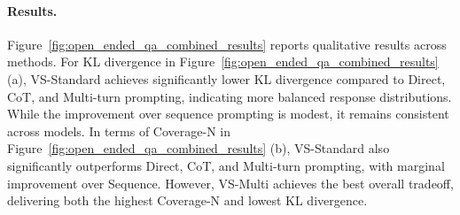 \begin{figure}
    \captionsetup{skip=2pt}
    \centering


    \label{tab:bias_coverage_test}
    \vspace{-2em}
\end{figure}

\paragraph{Results.} 
Figure~\ref{fig:open_ended_qa_combined_results} reports qualitative results across methods. 
For KL divergence in Figure~\ref{fig:open_ended_qa_combined_results} (a), VS-Standard achieves significantly lower KL divergence compared to Direct, CoT, and Multi-turn prompting, indicating more balanced response distributions. While the improvement over sequence prompting is modest, it remains consistent across models. 
In terms of Coverage-N in Figure~\ref{fig:open_ended_qa_combined_results} (b), VS-Standard also significantly outperforms Direct, CoT, and Multi-turn prompting, with marginal improvement over Sequence. However, VS-Multi achieves the best overall tradeoff, delivering both the highest Coverage-N and lowest KL divergence. 

